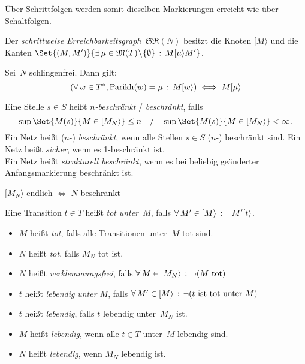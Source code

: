 \documentclass{cheat-sheet}
\newcommand{\activeTransition}[1]{[{#1}\rangle} %
\newcommand{\StepReachabilityGraph}{\mathfrak{SR}} %
\DeclareMathOperator{\Parikh}{Parikh} %
\newcommand{\Markings}{\mathfrak{M}} %
\begin{document}
\begin{bem}
  Über Schrittfolgen werden somit dieselben Markierungen erreicht wie über Schaltfolgen.
\end{bem}

\begin{defn}
  Der \emph{schrittweise Erreichbarkeitsgraph}~$\StepReachabilityGraph(N)$ besitzt die Knoten $\activeTransition{M}$ und die Kanten $\Set{(M, M')}{\ex{\mu \in \Markings(T) \!\setminus\! \{ \emptyset \}} M \activeTransition{\mu} M'}$.
\end{defn}

\begin{lem}
  Sei~$N$ schlingenfrei. Dann gilt:
  \[
    (\fa{w \in T^{*}, \Parikh(w) = \mu} M \activeTransition{w}) \iff M \activeTransition{\mu}
  \]
\end{lem}



\begin{defn}
  Eine Stelle $s \in S$ heißt \emph{$n$-beschränkt} / \emph{beschränkt}, falls
  \[
    \sup \Set{M(s)}{M \in \activeTransition{M_N}} \leq n
    \quad / \quad
    \sup \Set{M(s)}{M \in \activeTransition{M_N}} < \infty.
  \]
  Ein Netz heißt ($n$-) \textit{beschränkt}, wenn alle Stellen $s \in S$ ($n$-) beschränkt sind.
  Ein Netz heißt \emph{sicher}, wenn es 1-beschränkt ist. \\
  Ein Netz heißt \emph{strukturell beschränkt}, wenn es bei beliebig geänderter Anfangsmarkierung beschränkt ist.
\end{defn}

\begin{prop}
  $\activeTransition{M_N}$ endlich $\iff$ $N$ beschränkt
\end{prop}


\begin{defn}
  Eine Transition $t \in T$ heißt \emph{tot} \textit{unter~$M$}, falls $\fa{M' \in \activeTransition{M}} \neg M' \activeTransition{t}$.
  \begin{itemize}
    \item $M$ heißt \textit{tot}, falls alle Transitionen unter~$M$ tot sind.
    \item $N$ heißt \textit{tot}, falls $M_N$ tot ist.
    \item $N$ heißt \emph{verklemmungsfrei}, falls $\fa{M \in \activeTransition{M_N}} \neg (M \text{ tot})$
    \item $t$ heißt \emph{lebendig} \textit{unter $M$}, falls $\fa{M' \in \activeTransition{M}} \neg (t \text{ ist tot unter~$M$})$
    \item $t$ heißt \textit{lebendig}, falls $t$ lebendig unter~$M_N$ ist.
    \item $M$ heißt \textit{lebendig}, wenn alle $t \in T$ unter~$M$ lebendig sind.
    \item $N$ heißt \textit{lebendig}, wenn $M_N$ lebendig ist.
  \end{itemize}
\end{defn}
\end{document}
